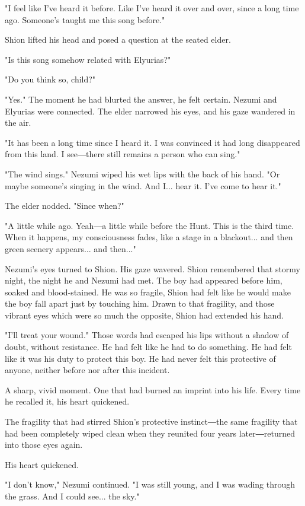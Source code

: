 "I feel like I've heard it before. Like I've heard it over and over,
since a long time ago. Someone's taught me this song before."

Shion lifted his head and posed a question at the seated elder.

"Is this song somehow related with Elyurias?"

"Do you think so, child?"

"Yes." The moment he had blurted the answer, he felt certain. Nezumi and
Elyurias were connected. The elder narrowed his eyes, and his gaze
wandered in the air.

"It has been a long time since I heard it. I was convinced it had long
disappeared from this land. I see―there still remains a person who can
sing."

"The wind sings." Nezumi wiped his wet lips with the back of his hand.
"Or maybe someone's singing in the wind. And I... hear it. I've come to
hear it."

The elder nodded. "Since when?"

"A little while ago. Yeah―a little while before the Hunt. This is the
third time. When it happens, my consciousness fades, like a stage in a
blackout... and then green scenery appears... and then..."

Nezumi's eyes turned to Shion. His gaze wavered. Shion remembered that
stormy night, the night he and Nezumi had met. The boy had appeared
before him, soaked and blood-stained. He was so fragile, Shion had felt
like he would make the boy fall apart just by touching him. Drawn to
that fragility, and those vibrant eyes which were so much the opposite,
Shion had extended his hand.

"I'll treat your wound." Those words had escaped his lips without a
shadow of doubt, without resistance. He had felt like he had to do
something. He had felt like it was his duty to protect this boy. He had
never felt this protective of anyone, neither before nor after this
incident.

A sharp, vivid moment. One that had burned an imprint into his life.
Every time he recalled it, his heart quickened.

The fragility that had stirred Shion's protective instinct―the same
fragility that had been completely wiped clean when they reunited four
years later―returned into those eyes again.

His heart quickened.

"I don't know," Nezumi continued. "I was still young, and I was wading
through the grass. And I could see... the sky."

